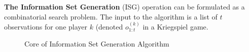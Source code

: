 \documentclass[10pt, conference, compsocconf]{IEEEtran}
\begin{document}

   
\textbf{The Information Set Generation}
(ISG) operation can be formulated as a combinatorial search problem.  The input to the algorithm is a list
of $t$ observations for one player $k$ (denoted $o_{1:t}^{(k)}$ in a Kriegspiel game.    
\begin{figure}[htpb]
\small
\begin{boxedminipage}{\columnwidth}
\begin{algorithmic}[1]
  \EndIf
\EndFunction
\end{algorithmic}
\end{boxedminipage}
\caption{Core of Information Set Generation Algorithm}
\label{codelisting1}
\vspace{-0.2in}
\end{figure}
\end{document}
